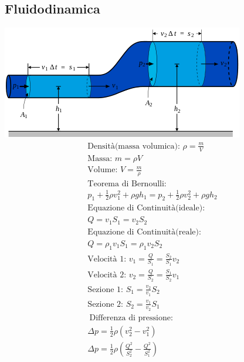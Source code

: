\subsection{Fluidodinamica}

\includegraphics[width=1 \linewidth]{FluidoDinamica/flusso.png} \\

\begin{gather*}
    \text{Densità(massa volumica): } \rho = \frac{m}{V} \\
    \text{Massa: } m = \rho V \\
    \text{Volume: } V = \frac{m}{\rho} \\
    \text{Teorema di Bernoulli: } \\ p_1 + \frac{1}{2} \rho v_1^2 + \rho g h_1 = p_2 + \frac{1}{2} \rho v_2^2 + \rho g h_2 \\
    \text{Equazione di Continuità(ideale): } \\  Q = v_1 S_1 = v_2 S_2 \\
    \text{Equazione di Continuità(reale): } \\ Q = \rho_1 v_1 S_1 = \rho_1 v_2 S_2 \\
    \text{Velocità 1: } v_1 = \frac{Q}{S_1} = \frac{S_2}{S_1} v_2 \\
    \text{Velocità 2: } v_2 = \frac{Q}{S_2} = \frac{S_1}{S_2} v_1 \\
    \text{Sezione 1: } S_1 = \frac{v_2}{v_1} S_2 \\
    \text{Sezione 2: } S_2 = \frac{v_1}{v_2} S_1 \\\
    \text{Differenza di pressione: } \\
    \Delta p = \frac{1}{2} \rho (v_2^2 - v_1^2) \\ 
    \Delta p = \frac{1}{2} \rho (\frac{Q^2}{S_2^2} - \frac{Q^2}{S_1^2})
\end{gather*}